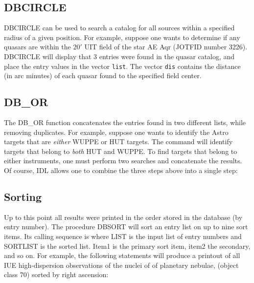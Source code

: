 \subsection{DBCIRCLE}
DBCIRCLE can be used to search a catalog for all sources within a specified
radius of a given position.  For example, suppose one wants to determine
if any quasars are within the $20'$ UIT field of the star AE Aqr (JOTFID number 3226).
\exbegin
{}
\exend
DBCIRCLE will display that 3 entries were found in the quasar catalog, and
place the entry values in the vector {\tt list}.
The vector {\tt dis} contains the distance (in arc minutes) of each quasar 
found to the specified field center.   

\subsection{DB\_OR}
The DB\_OR function concatenates the entries found in two different
lists, while removing duplicates.
For example, suppose one wants to identify the Astro targets that are 
{\em either} WUPPE or HUT targets. The command
will identify targets that belong to  {\em both}  HUT and WUPPE.
To find targets that belong to either instruments, one must perform
two searches and concatenate the results.
\exbegin
{}
\exend
Of course, IDL allows one to combine the three steps above into a single step:
\subsection{Sorting}
Up to this point all results were printed in the order stored in the database
(by entry number).  The procedure DBSORT will sort an entry list on up to nine
sort items.  Its calling sequence is  
where LIST is the input list of entry numbers and SORTLIST is the sorted
list.   Item1 is the primary sort item, item2 the secondary, and so on.
For example, the following statements will produce a printout of all 
IUE high-dispersion observations of the nuclei of of planetary nebulae,
(object class 70)
sorted by right ascension:
\exbegin
{}
\exend
